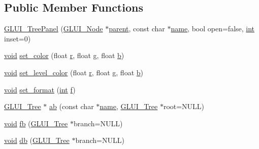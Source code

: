 \subsection*{Public Member Functions}
\begin{DoxyCompactItemize}
\item 
\hyperlink{class_g_l_u_i___tree_panel_a17ff7ac24968bdad9adfd4356361925e}{G\+L\+U\+I\+\_\+\+Tree\+Panel} (\hyperlink{class_g_l_u_i___node}{G\+L\+U\+I\+\_\+\+Node} $\ast$\hyperlink{class_g_l_u_i___node_a8ed65d447784f6f88bd3e2e2bcac6cdb}{parent}, const char $\ast$\hyperlink{glext_8h_ad977737dfc9a274a62741b9500c49a32}{name}, bool open=false, \hyperlink{wglext_8h_a500a82aecba06f4550f6849b8099ca21}{int} inset=0)
\item 
\hyperlink{wglext_8h_a9e6b7f1933461ef318bb000d6bd13b83}{void} \hyperlink{class_g_l_u_i___tree_panel_af87e1c64a80d4179e48dc93f513ca41d}{set\+\_\+color} (float \hyperlink{glext_8h_a42ce7cdc612e53abee15043f80220d97}{r}, float \hyperlink{glext_8h_acaceb3a655ff28b75259860bcb868f9f}{g}, float \hyperlink{glext_8h_a0f71581a41fd2264c8944126dabbd010}{b})
\item 
\hyperlink{wglext_8h_a9e6b7f1933461ef318bb000d6bd13b83}{void} \hyperlink{class_g_l_u_i___tree_panel_a8b951971bf5b8416624ff02fa60c0528}{set\+\_\+level\+\_\+color} (float \hyperlink{glext_8h_a42ce7cdc612e53abee15043f80220d97}{r}, float \hyperlink{glext_8h_acaceb3a655ff28b75259860bcb868f9f}{g}, float \hyperlink{glext_8h_a0f71581a41fd2264c8944126dabbd010}{b})
\item 
\hyperlink{wglext_8h_a9e6b7f1933461ef318bb000d6bd13b83}{void} \hyperlink{class_g_l_u_i___tree_panel_ad695187114e8a0de9cf42c15ab1203c9}{set\+\_\+format} (\hyperlink{wglext_8h_a500a82aecba06f4550f6849b8099ca21}{int} \hyperlink{glext_8h_a691492ec0bd6383f91200e49f6ae40ed}{f})
\item 
\hyperlink{class_g_l_u_i___tree}{G\+L\+U\+I\+\_\+\+Tree} $\ast$ \hyperlink{class_g_l_u_i___tree_panel_ac1a73b9bd8b456effbfcad7ae9a025bc}{ab} (const char $\ast$\hyperlink{glext_8h_ad977737dfc9a274a62741b9500c49a32}{name}, \hyperlink{class_g_l_u_i___tree}{G\+L\+U\+I\+\_\+\+Tree} $\ast$root=N\+U\+L\+L)
\item 
\hyperlink{wglext_8h_a9e6b7f1933461ef318bb000d6bd13b83}{void} \hyperlink{class_g_l_u_i___tree_panel_ae4b712e959b301b046ecc8fee39a3161}{fb} (\hyperlink{class_g_l_u_i___tree}{G\+L\+U\+I\+\_\+\+Tree} $\ast$branch=N\+U\+L\+L)
\item 
\hyperlink{wglext_8h_a9e6b7f1933461ef318bb000d6bd13b83}{void} \hyperlink{class_g_l_u_i___tree_panel_ab9ab4943caa74579295980862a660eb0}{db} (\hyperlink{class_g_l_u_i___tree}{G\+L\+U\+I\+\_\+\+Tree} $\ast$branch=N\+U\+L\+L)

\end{DoxyCompactItemize}
